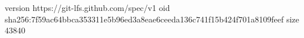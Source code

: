 version https://git-lfs.github.com/spec/v1
oid sha256:7f59ac64bbca353311e5b96ed3a8eae6ceeda136c741f15b424f701a8109feef
size 43840
